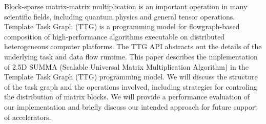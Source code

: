 Block-sparse matrix-matrix multiplication is an important operation in many scientific fields, including quantum physics and general tensor operations. Template Task Graph (TTG) is a programming model for flowgraph-based composition of high-performance algorithms executable on distributed heterogeneous computer platforms. The TTG API abstracts out the details of the underlying task and data flow runtime. This paper describes the implementation of 2.5D SUMMA (Scalable Universal Matrix Multiplication Algorithm) in the Template Task Graph (TTG) programming model. We will discuss the structure of the task graph and the operations involved, including strategies for controling the distribution of matrix blocks. We will provide a performance evaluation of our implementation and briefly discuss our intended approach for future support of accelerators.
